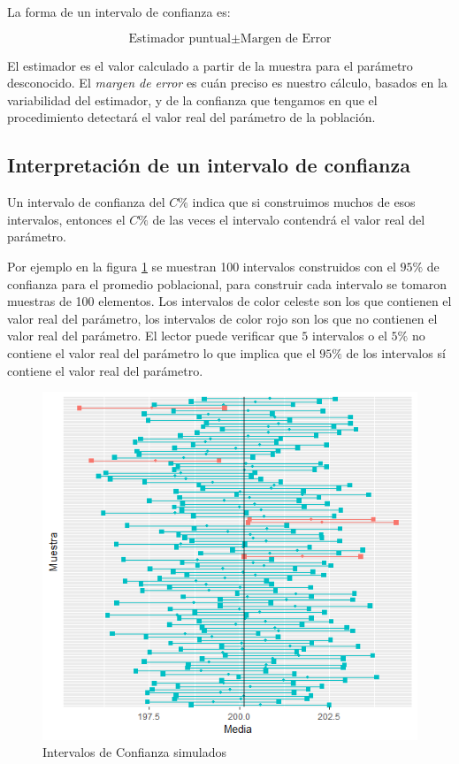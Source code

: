 \documentclass[letterpaper,]{book}
\begin{document}
La forma de un intervalo de confianza es:

\begin{equation} 
  \text{Estimador puntual} \pm \text{Margen de Error}
  \label{eq:ic}
\end{equation}

El estimador es el valor calculado a partir de la muestra para el parámetro desconocido. El \emph{margen de error} es cuán preciso es nuestro cálculo, basados en la variabilidad del estimador, y de la confianza que tengamos en que el procedimiento detectará el valor real del parámetro de la población.

\hypertarget{interpretacion-de-un-intervalo-de-confianza}{%
\subsection{Interpretación de un intervalo de confianza}\label{interpretacion-de-un-intervalo-de-confianza}}

Un intervalo de confianza del \(C \%\) indica que si construimos muchos de esos intervalos, entonces el \(C \%\) de las veces el intervalo contendrá el valor real del parámetro.

Por ejemplo en la figura \ref{fig:ic} se muestran 100 intervalos construidos con el \(95 \%\) de confianza para el promedio poblacional, para construir cada intervalo se tomaron muestras de 100 elementos. Los intervalos de color celeste son los que contienen el valor real del parámetro, los intervalos de color rojo son los que no contienen el valor real del parámetro. El lector puede verificar que \(5\) intervalos o el \(5 \%\) no contiene el valor real del parámetro lo que implica que el \(95 \%\) de los intervalos sí contiene el valor real del parámetro.

\begin{figure}[h!]

{\centering \includegraphics[width=0.7\linewidth]{ic} 

}

\caption{Intervalos de Confianza simulados}\label{fig:ic}
\end{figure}
\end{document}
